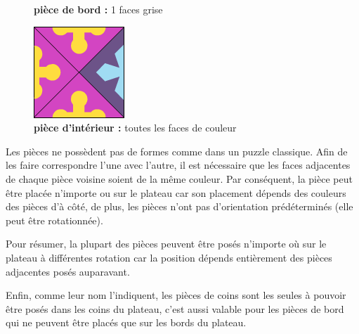 \begin{figure}[H]
	   	\caption{\textbf{pièce de bord :} 1 faces grise}\label{fig:piece_bord}
	   	\endminipage\hfill
	   	\includegraphics[width=\linewidth]{images/piece_interieure.png}
	   	\caption{\textbf{pièce d'intérieur :} toutes les faces de couleur}\label{fig:piece_interieure}
	   	\endminipage
	\end{figure}

	Les pièces ne possèdent pas de formes comme dans un puzzle classique. Afin de les faire correspondre l'une avec l'autre, il est nécessaire que les faces adjacentes de chaque pièce voisine soient de la même couleur. Par conséquent, la pièce peut être placée n'importe ou sur le plateau car son placement dépends des couleurs des pièces d'à côté, de plus, les pièces n'ont pas d'orientation prédéterminés (elle peut être rotationnée).
	
	Pour résumer, la plupart des pièces peuvent être posés n'importe où sur le plateau à différentes rotation car la position dépends entièrement des pièces adjacentes posés auparavant. 
	
	Enfin, comme leur nom l'indiquent, les pièces de coins sont les seules à pouvoir être posés dans les coins du plateau, c'est aussi valable pour les pièces de bord qui ne peuvent être placés que sur les bords du plateau.
	
